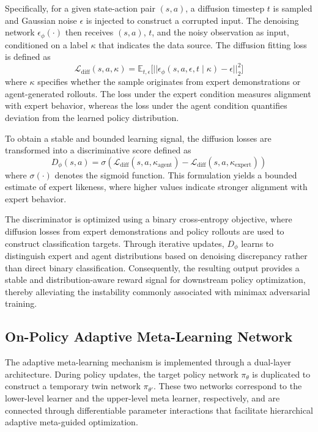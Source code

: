 \documentclass[journal]{IEEEtran}
\begin{document}
Specifically, for a given state-action pair $(s,a)$, a diffusion timestep $t$ is sampled and Gaussian noise $\epsilon$ is injected to construct a corrupted input.
The denoising network $\epsilon_\phi(\cdot)$ then receives $(s,a)$, $t$, and the noisy observation as input, conditioned on a label $\kappa$ that indicates the data source.
The diffusion fitting loss is defined as
\begin{equation}
\label{eq:diff_loss_re}
\mathcal{L}_{\text{diff}}(s,a,\kappa)= \mathbb{E}_{t,\epsilon}\Big[||\epsilon_\phi(s,a,\epsilon,t\mid \kappa)-\epsilon||_2^2\Big]
\end{equation}
where $\kappa$ specifies whether the sample originates from expert demonstrations or agent-generated rollouts. The loss under the expert condition measures alignment with expert behavior, whereas the loss under the agent condition quantifies deviation from the learned policy distribution.

To obtain a stable and bounded learning signal, the diffusion losses are transformed into a discriminative score defined as
\begin{equation}
  \label{eq:discriminator}
  D_\phi(s,a)=\sigma\left(\mathcal{L}_{\text{diff}}(s,a,\kappa_{\text{agent}}) -\mathcal{L}_{\text{diff}}(s,a,\kappa_{\text{expert}})\right)
\end{equation}
where $\sigma(\cdot)$ denotes the sigmoid function. This formulation yields a bounded estimate of expert likeness, where higher values indicate stronger alignment with expert behavior.

The discriminator is optimized using a binary cross-entropy objective, where diffusion losses from expert demonstrations and policy rollouts are used to construct classification targets. Through iterative updates, $D_\phi$ learns to distinguish expert and agent distributions based on denoising discrepancy rather than direct binary classification\cite{wang2024diffail,lai2024diffusion}. Consequently, the resulting output provides a stable and distribution-aware reward signal for downstream policy optimization, thereby alleviating the instability commonly associated with minimax adversarial training.

\subsection{On-Policy Adaptive Meta-Learning Network}

The adaptive meta-learning mechanism is implemented through a dual-layer architecture\cite{finn2017model,hospedales2021meta}. During policy updates, the target policy network $\pi_\theta$ is duplicated to construct a temporary twin network $\pi_{\theta'}$. These two networks correspond to the lower-level learner and the upper-level meta learner, respectively, and are connected through differentiable parameter interactions that facilitate hierarchical adaptive meta-guided optimization.
\end{document}
